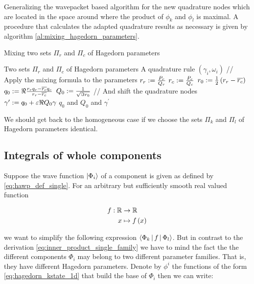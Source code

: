 \begin{chapter}{Generalizing the wavepacket based algorithm}
for the new quadrature nodes which are located in the space around where
the product of $\phi_k$ and $\phi_l$ is maximal. A procedure that calculates
the adapted quadrature results as necessary is given by algorithm \ref{al:mixing_hagedorn_parameters}.

\begin{algorithm}
\caption{Mixing two sets $\Pi_r$ and $\Pi_c$ of Hagedorn parameters}
\label{al:mixing_hagedorn_parameters}
\begin{algorithmic}
  \REQUIRE Two sets $\Pi_r$ and $\Pi_c$ of Hagedorn parameters
  \REQUIRE A quadrature rule $\left(\gamma_i, \omega_i\right)$
  \STATE // Apply the mixing formula to the parameters
  \STATE $r_r := \frac{P_r}{Q_r}$
  \STATE $r_c := \frac{P_c}{Q_c}$
  \STATE $r_0 := \frac{1}{2}\left(r_r - \overline{r_c}\right)$
  \STATE $q_0 := \Re \frac{r_r q_r - \overline{r_c} q_c}{r_r - \overline{r_c}}$
  \STATE $Q_0 := \frac{1}{\sqrt{\Im r_0}}$
  \STATE // And shift the quadrature nodes
  \STATE $\gamma^\prime := q_0 + \varepsilon \Re Q_0 \gamma$
  \RETURN $q_0$ and $Q_0$ and $\gamma^\prime$
\end{algorithmic}
\end{algorithm}

We should get back to the homogeneous case if we choose the sets $\Pi_k$ and
$\Pi_l$ of Hagedorn parameters identical.

\subsection{Integrals of whole components}

Suppose the wave function $\Ket{\Phi_i}$ of a component is given as defined by
\eqref{eq:hawp_def_single}. For an arbitrary but sufficiently smooth real valued
function

\begin{align*}
  f : \mathbb{R} & \rightarrow \mathbb{R} \\
               x & \mapsto f \left( x \right)
\end{align*}

we want to simplify the following expression $\Braket{ \Phi_k | f | \Phi_l }$.
But in contrast to the derivation \eqref{eq:inner_product_single_family} we have
to mind the fact the the different components $\Phi_i$ may belong to two different
parameter families. That is, they have different Hagedorn parameters. Denote by
$\phi^i$ the functions of the form \eqref{eq:hagedorn_kstate_1d} that build the
base of $\Phi_i$ then we can write:


\end{chapter}
